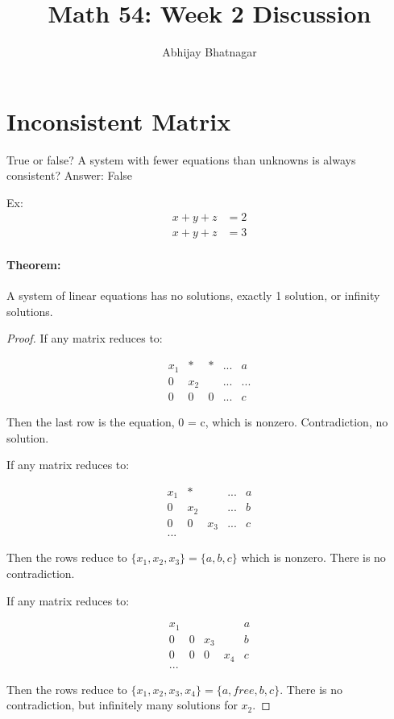 \documentclass[11pt]{report}
\newenvironment{theorem}{\paragraph{Theorem:}}{\hfill}
\begin{document}
   \title{Math 54: Week 2 Discussion}
   \author{Abhijay Bhatnagar}
   \maketitle
   \tableofcontents


\setcounter{secnumdepth}{0} %
\section{Inconsistent Matrix}

True or false? A system with fewer equations than unknowns is always consistent? Answer: False

Ex: 
\begin{align}
x + y + z &= 2 \\
x + y + z &= 3
\end{align}

\begin{theorem}
	A system of linear equations has no solutions, exactly 1 solution, or infinity solutions.
\end{theorem}
\begin{proof}
If any matrix reduces to:

\begin{center}
\[\begin{matrix}
  x_1 & * & * & ... & a \\
  0 & x_2 & & ... & ...\\
  0 & 0 & 0 & ... & c
\end{matrix}
\]

Then the last row is the equation, 0 = c, which is nonzero. Contradiction, no solution.

\end{center}

If any matrix reduces to:

\begin{center}
\[\begin{matrix}
  x_1 & * &  & ... & a \\
  0 & x_2 & & ... & b\\
  0 & 0 & x_3 & ... & c \\
  ...
\end{matrix}\]


Then the rows reduce to  $\{x_1, x_2, x_3\} = \{a,b,c\}$ which is nonzero. There is no contradiction.

\end{center}

If any matrix reduces to:

\begin{center}
\[\begin{matrix}
  x_1 &  &  & & a \\
  0 & 0 & x_3 &  & b\\
  0 & 0 & 0 & x_4 & c \\
  ...
\end{matrix}\]

\end{center}
Then the rows reduce to  $\{x_1, x_2, x_3, x_4\} = \{a, free, b,c\}$. There is no contradiction, but infinitely many solutions for $x_2$.

\end{proof}
\end{document}

